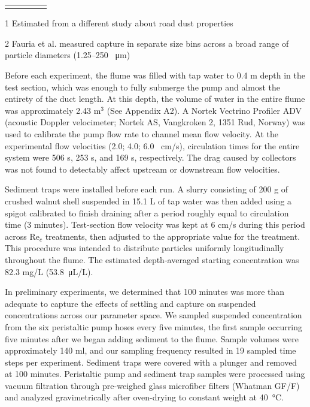\documentclass[geosciences,article,submit,moreauthors,pdftex]{Definitions/mdpi}
\newcommand\Rey{\mathrm{Re}}
\begin{document}
\begin{table}
\begin{threeparttable}
\begin{tabular}{lcccc}
\bottomrule
\vspace{-4mm}
\end{tabular}
\begin{tablenotes}
\footnotesize \item[1] Estimated from a different study about road dust properties \cite{mckenzie2008size} 
\vspace{2mm}
\footnotesize \item[2] Fauria et al. \cite{Fauria_2015} measured capture in separate size bins across a broad range of particle diameters (1.25--250 \SI{}{\micro\metre})
\end{tablenotes}
\end{threeparttable}
\label{tbl:parameters}
\end{table}

Before each experiment, the flume was filled with tap water to 0.4 m depth in the test section, which was enough to fully submerge the pump and almost the entirety of the duct length. At this depth, the volume of water in the entire flume was approximately 2.43 m$^3$ (See Appendix A2).  A Nortek Vectrino Profiler ADV (acoustic Doppler velocimeter; Nortek AS, Vangkroken 2, 1351 Rud, Norway) was used to calibrate the pump flow rate to channel mean flow velocity. At the experimental flow velocities (2.0; 4.0; 6.0 \SI{}{\centi\metre/\second}), circulation times for the entire system were 506 s, 253 s, and 169 s, respectively. The drag caused by collectors was not found to detectably affect upstream or downstream flow velocities.

Sediment traps were installed before each run. A slurry consisting of 200 g of crushed walnut shell suspended in 15.1 L of tap water was then added using a spigot calibrated to finish draining after a period roughly equal to circulation time (3 minutes). Test-section flow velocity was kept at 6 cm/s during this period across $\Rey_c$ treatments, then adjusted to the appropriate value for the treatment. This procedure was intended to distribute particles uniformly longitudinally throughout the flume. The estimated depth-averaged starting concentration was 82.3 mg/L (\SI{53.8}{\micro\liter/\liter}).

In preliminary experiments, we determined that 100 minutes was more than adequate to capture the effects of settling and capture on suspended concentrations across our parameter space. We sampled suspended concentration from the six peristaltic pump hoses every five minutes, the first sample occurring five minutes after we began adding sediment to the flume. Sample volumes were approximately 140 ml, and our sampling frequency resulted in 19 sampled time steps per experiment. Sediment traps were covered with a plunger and removed at 100 minutes. Peristaltic pump and sediment trap samples were processed using vacuum filtration through pre-weighed glass microfiber filters (Whatman GF/F) and analyzed gravimetrically after oven-drying to constant weight at \SI{40}{\celsius}.
\end{document}
